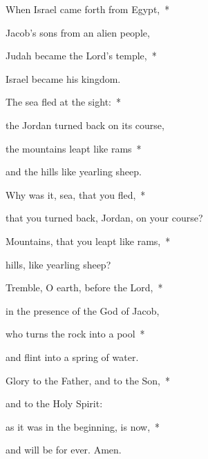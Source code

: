 \noindent When Israel came forth from Egypt,~*~

Jacob’s sons from an alien people,

\noindent Judah became the Lord’s temple,~*~

Israel became his kingdom.

\noindent The sea fled at the sight:~*~

the Jordan turned back on its course,

\noindent the mountains leapt like rams~*~

and the hills like yearling sheep.

\noindent Why was it, sea, that you fled,~*~

that you turned back, Jordan, on your course?

\noindent Mountains, that you leapt like rams,~*~

hills, like yearling sheep?

\noindent Tremble, O earth, before the Lord,~*~

in the presence of the God of Jacob,

\noindent who turns the rock into a pool~*~

and flint into a spring of water.

\noindent Glory to the Father, and to the Son,~*~

and to the Holy Spirit:

\noindent as it was in the beginning, is now,~*~

and will be for ever. Amen.